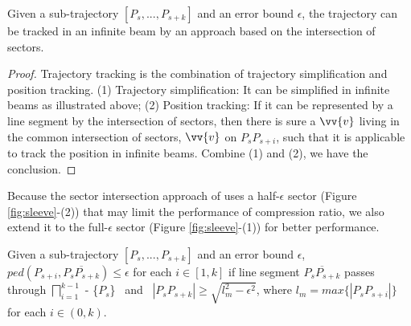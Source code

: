 \begin{proposition}
	\label{theo-half-sector}
	Given a sub-trajectory $[P_s,...,P_{s+k}]$ and an error bound $\epsilon$, the trajectory can be tracked in an infinite beam by an approach based on the intersection of sectors.
\end{proposition}

\begin{proof}
Trajectory tracking is the combination of trajectory simplification and position tracking.
%
(1) Trajectory simplification: It can be simplified in infinite beams as illustrated above;
%
(2) Position tracking: If it can be represented by a line segment by the intersection of sectors, then there is sure a $\vv{v}$ living in the common intersection of sectors, \eg $\vv{v}$ on $P_sP_{s+i}$, such that it is applicable to track the position in infinite beams.
%
Combine (1) and (2), we have the conclusion.
\end{proof}

Because the sector intersection approach of \cite{Williams:Longest, Sklansky:Cone,Zhao:Sleeve} uses a half-$\epsilon$ sector (Figure \ref{fig:sleeve}-(2)) that may limit the performance of compression ratio, we also extend it to the full-$\epsilon$ sector (Figure \ref{fig:sleeve}-(1)) for better performance.

\begin{proposition}
	\label{theo-full-sector}
	Given a sub-trajectory $[P_s,...,P_{s+k}]$ and an error bound $\epsilon$, $ped(P_{s+i}, \overline{P_sP_{s+k}})\le \epsilon$ for each $i \in [1,k]$ if line segment $\overline{P_sP_{s+k}}$ passes through $\bigsqcap_{i=1}^{k-1}$ - \{$P_s$\} ~and~ $|P_sP_{s+k}| \ge \sqrt{l_{m}^2 - \epsilon^2}$, where $l_{m} = max\{|P_sP_{s+i}|\}$ for each $i \in (0, k)$.
\end{proposition}

